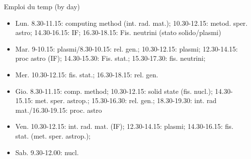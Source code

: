 \documentclass[10pt,xcolor={usenames},fleqn,mathserif,serif]{beamer}
\begin{document}
\begin{frame}[allowframebreaks,label={byday}]{Emploi du temp (by day)}
\begin{itemize}
\item Lun. 8.30-11.15: computing method (int. rad. mat.); 10.30-12.15: metod. sper. astro; 14.30-16.15: IF; 16.30-18.15: Fis. neutrini (stato solido/plasmi)
\item Mar. 9-10.15: plasmi/8.30-10.15: rel. gen.; 10.30-12.15: plasmi; 12.30-14.15: proc astro (IF); 14.30-15.30: Fis. stat.; 15.30-17.30: fis. neutrini;
\item Mer. 10.30-12.15: fis. stat.; 16.30-18.15: rel. gen.
\item Gio. 8.30-11.15: comp. method; 10.30-12.15: solid state (fis. nucl.); 14.30-15.15: met. sper. astrop.; 15.30-16.30: rel. gen.; 18.30-19.30: int. rad mat./16.30-19.15: proc. astro
\item Ven. 10.30-12.15: int. rad. mat. (IF); 12.30-14.15: plasmi; 14.30-16.15: fis. stat. (met. sper. astrop.);
\item Sab. 9.30-12.00: nucl.
\end{itemize}
\end{frame}
\end{document}
